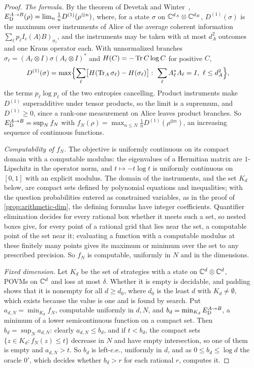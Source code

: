 \begin{proof}
\emph{The formula.} By the theorem of Devetak and Winter~\cite[Theorem~13 of the arXiv version]{DW05},
$E_{\mathrm D}^{A\to B}(\rho)=\lim_n\frac1nD^{(1)}(\rho^{\otimes n})$, where, for a state $\sigma$ on $\mathbb C^{d_A}\otimes\mathbb C^{d_B}$, $D^{(1)}(\sigma)$ is the
maximum over instruments of Alice of the average coherent information $\sum_\ell p_\ell I_c(A\rangle B)_{\sigma_\ell}$, and the instruments may
be taken with at most $d_A^2$ outcomes and one Kraus operator each. With unnormalized branches
$\sigma_\ell=(A_\ell\otimes I)\sigma(A_\ell\otimes I)^*$ and $H(C)=-\operatorname{Tr} C\log C$ for positive $C$,
\[
D^{(1)}(\sigma)=\max\Bigl\{\sum_\ell\bigl[H(\Tr_A\sigma_\ell)-H(\sigma_\ell)\bigr]:\ \sum_\ell A_\ell^*A_\ell=I,\ \ell\le d_A^2\Bigr\},
\]
the terms $p_\ell\log p_\ell$ of the two entropies cancelling. Product instruments make $D^{(1)}$ superadditive under tensor products, so
the limit is a supremum, and $D^{(1)}\ge0$, since a rank-one measurement on Alice leaves product branches. So
$E_{\mathrm D}^{A\to B}=\sup_Nf_N$ with $f_N(\rho)=\max_{n\le N}\frac1nD^{(1)}(\rho^{\otimes n})$, an increasing sequence of continuous functions.

\emph{Computability of $f_N$.} The objective is uniformly continuous on its compact domain with a computable modulus: the eigenvalues of a
Hermitian matrix are $1$-Lipschitz in the operator norm, and $t\mapsto-t\log t$ is uniformly continuous on $[0,1]$ with an explicit modulus.
The domain of the instruments, and the set $K_d$ below, are compact sets defined by polynomial equations and inequalities; with the question
probabilities entered as constrained variables, as in the proof of \cref{prop:arithmetic-dim}, the defining formulas have integer
coefficients. Quantifier elimination decides for every rational box whether it meets such a set, so nested boxes give, for
every point of a rational grid that lies near the set, a computable point of the set near it; evaluating a function with a computable
modulus at these finitely many points gives its maximum or minimum over the set to any prescribed precision. So $f_N$ is computable,
uniformly in $N$ and in the dimensions.

\emph{Fixed dimension.} Let $K_d$ be the set of strategies with a state on $\mathbb C^d\otimes\mathbb C^d$, POVMs on $\mathbb C^d$ and loss at most $\delta$.
Whether it is empty is decidable, and padding shows that it is nonempty for all $d\ge d_0$, where $d_0$ is the least $d$ with
$K_d\ne\emptyset$, which exists because the value is one and is found by search. Put $a_{d,N}=\min_{K_d}f_N$, computable uniformly in $d,N$, and
$b_d=\min_{K_d}E_{\mathrm D}^{A\to B}$, a minimum of a lower semicontinuous function on a compact set. Then $b_d=\sup_Na_{d,N}$: clearly
$a_{d,N}\le b_d$, and if $t<b_d$, the compact sets $\{z\in K_d:f_N(z)\le t\}$ decrease in $N$ and have empty intersection, so one of them is
empty and $a_{d,N}>t$. So $b_d$ is left-c.e., uniformly in $d$, and as $0\le b_d\le\log d$ the oracle $0'$, which decides whether $b_d>r$
for each rational $r$, computes it.


\end{proof}
